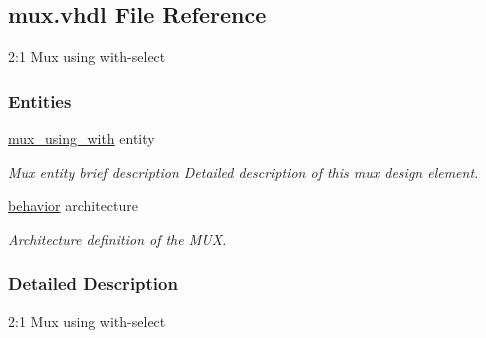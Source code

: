 \hypertarget{mux_8vhdl}{}\subsection{mux.\+vhdl File Reference}
\label{mux_8vhdl}


2\+:1 Mux using with-\/select  


\subsubsection*{Entities}
\begin{DoxyCompactItemize}
\item 
\mbox{\hyperlink{classmux__using__with}{mux\+\_\+using\+\_\+with}} entity
\begin{DoxyCompactList}\small\item\em Mux entity brief description Detailed description of this mux design element. \end{DoxyCompactList}\item 
\mbox{\hyperlink{classmux__using__with_1_1behavior}{behavior}} architecture
\begin{DoxyCompactList}\small\item\em Architecture definition of the M\+UX. \end{DoxyCompactList}\end{DoxyCompactItemize}


\subsubsection{Detailed Description}
2\+:1 Mux using with-\/select 

